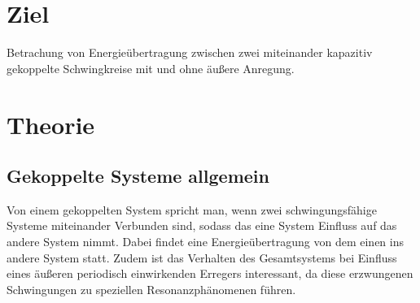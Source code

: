 \newpage
\section*{Ziel}
Betrachung von Energieübertragung zwischen zwei miteinander kapazitiv 
gekoppelte Schwingkreise mit und ohne äußere Anregung.
\section{Theorie}
\subsection{Gekoppelte Systeme allgemein}
Von einem gekoppelten System spricht man, wenn zwei schwingungsfähige Systeme miteinander
Verbunden sind, sodass das eine System Einfluss auf das andere System nimmt. Dabei 
findet eine Energieübertragung von dem einen ins andere System statt.
Zudem ist das Verhalten des Gesamtsystems bei Einfluss eines äußeren periodisch einwirkenden 
Erregers interessant, da diese erzwungenen Schwingungen zu speziellen Resonanzphänomenen
führen.
